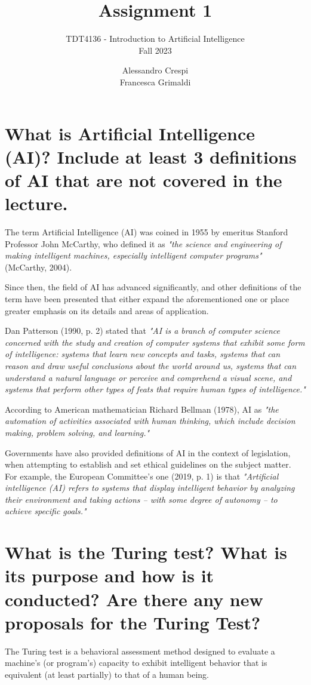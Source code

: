 \documentclass{article}
\title{%
    \huge Assignment 1
    }
\subtitle{%
    TDT4136 - Introduction to Artificial Intelligence \\
    Fall 2023
    }
\author{%
  Alessandro Crespi\\
  Francesca Grimaldi\\
}
\date{}
\begin{document}
\maketitle




\section{What is Artificial Intelligence (AI)? Include at least 3 definitions of AI that are not covered in the
lecture.}
The term Artificial Intelligence (AI) was coined in 1955 by emeritus Stanford Professor John McCarthy, who defined it as \emph{"the science and engineering of making intelligent machines, especially intelligent computer programs"} (McCarthy, 2004).

Since then, the field of AI has advanced significantly, and other definitions of the term have been presented that either expand the aforementioned one or place greater emphasis on its details and areas of application.

Dan Patterson (1990, p. 2) stated that \emph{"AI is a branch of computer science concerned with the study and creation of computer systems that exhibit some form of intelligence: systems that learn new concepts and tasks, systems that can reason and draw useful conclusions about the world around us, systems that can understand a natural language or perceive and comprehend a visual scene, and systems that perform other types of feats that require human types of intelligence."}

According to American mathematician Richard Bellman (1978), AI as \emph{"the automation of activities associated with human thinking, which include decision making, problem solving, and learning."}

Governments have also provided definitions of AI in the context of legislation, when attempting to establish and set ethical guidelines on the subject matter.
For example, the European Committee's one (2019, p. 1) is that \emph{"Artificial intelligence (AI) refers to systems that display intelligent behavior by analyzing their environment and taking actions – with some degree of autonomy – to achieve specific goals."}


\section{What is the Turing test? What is its purpose and how is it conducted? Are there any new proposals
for the Turing Test?}
The Turing test is a behavioral assessment method designed to evaluate a machine's (or program's) capacity to exhibit intelligent behavior that is equivalent (at least partially) to that of a human being. 
\end{document}
